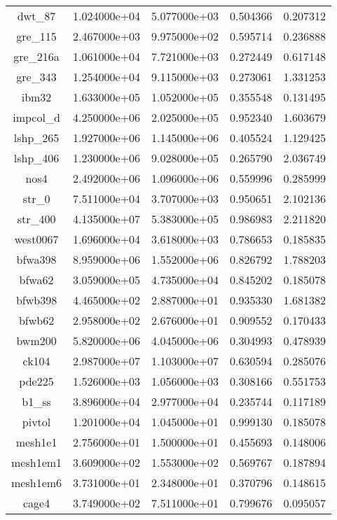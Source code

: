 \begin{table}[h]
\begin{tabular}{ccccc}
    dwt\_87 & 1.024000e+04 & 5.077000e+03 & 0.504366 & 0.207312\\
    gre\_115 & 2.467000e+03 & 9.975000e+02 & 0.595714 & 0.236888\\
    gre\_216a & 1.061000e+04 & 7.721000e+03 & 0.272449 & 0.617148\\
    gre\_343 & 1.254000e+04 & 9.115000e+03 & 0.273061 & 1.331253\\
    ibm32 & 1.633000e+05 & 1.052000e+05 & 0.355548 & 0.131495\\
    impcol\_d & 4.250000e+06 & 2.025000e+05 & 0.952340 & 1.603679\\
    lshp\_265 & 1.927000e+06 & 1.145000e+06 & 0.405524 & 1.129425\\
    lshp\_406 & 1.230000e+06 & 9.028000e+05 & 0.265790 & 2.036749\\
    nos4 & 2.492000e+06 & 1.096000e+06 & 0.559996 & 0.285999\\
    str\_0 & 7.511000e+04 & 3.707000e+03 & 0.950651 & 2.102136\\
    str\_400 & 4.135000e+07 & 5.383000e+05 & 0.986983 & 2.211820\\
    west0067 & 1.696000e+04 & 3.618000e+03 & 0.786653 & 0.185835\\
    bfwa398 & 8.959000e+06 & 1.552000e+06 & 0.826792 & 1.788203\\
    bfwa62 & 3.059000e+05 & 4.735000e+04 & 0.845202 & 0.185078\\
    bfwb398 & 4.465000e+02 & 2.887000e+01 & 0.935330 & 1.681382\\
    bfwb62 & 2.958000e+02 & 2.676000e+01 & 0.909552 & 0.170433\\
    bwm200 & 5.820000e+06 & 4.045000e+06 & 0.304993 & 0.478939\\
    ck104 & 2.987000e+07 & 1.103000e+07 & 0.630594 & 0.285076\\
    pde225 & 1.526000e+03 & 1.056000e+03 & 0.308166 & 0.551753\\
    b1\_ss & 3.896000e+04 & 2.977000e+04 & 0.235744 & 0.117189\\
    pivtol & 1.201000e+04 & 1.045000e+01 & 0.999130 & 0.185078\\
    mesh1e1 & 2.756000e+01 & 1.500000e+01 & 0.455693 & 0.148006\\
    mesh1em1 & 3.609000e+02 & 1.553000e+02 & 0.569767 & 0.187894\\
    mesh1em6 & 3.731000e+01 & 2.348000e+01 & 0.370796 & 0.148615\\
    cage4 & 3.749000e+02 & 7.511000e+01 & 0.799676 & 0.095057\\

\end{tabular}
\end{table}
